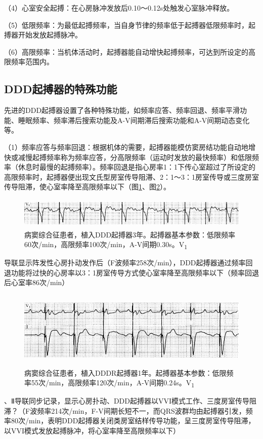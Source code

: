（4）心室安全起搏：在心房脉冲发放后0.10～0.12s处触发心室脉冲释放。

（5）低限频率：为最低起搏频率，当自身节律的频率低于起搏器低限频率时，起搏器开始发放起搏脉冲。

（6）高限频率：当机体活动时，起搏器能自动增快起搏频率，可达到所设定的高限频率范围内。

\protect\hypertarget{text00045.htmlux5cux23subid496}{}{}

\subsection{DDD起搏器的特殊功能}

先进的DDD起搏器设置了各种特殊功能，如频率应答、频率回退、频率平滑功能、睡眠频率、频率滞后搜索功能及A-V间期滞后搜索功能和A-V间期动态变化等。

（1）频率应答与频率回退：根据机体的需要，起搏器能模仿窦房结功能自动地增快或减慢起搏频率称为频率应答，分高限频率（运动时发放的最快频率）和低限频率（休息时最慢的起搏频率）。频率回退是指心房率1：1下传心室超过了所设定的高限频率时，起搏器便出现文氏型房室传导阻滞、2：1～3：1房室传导或三度房室传导阻滞，使心室率降至高限频率以下（图\ref{fig38-28}、图\ref{fig38-29}）。

\begin{figure}[!htbp]
 \centering
 \includegraphics[width=5.58333in,height=0.58333in]{./images/Image00631.jpg}
 \captionsetup{justification=centering}
 \caption{病窦综合征患者，植入DDD起搏器3年。起搏器基本参数：低限频率60次/min，高限频率100次/min，A-V间期0.30s。V\textsubscript{1}}
 \label{fig38-28}
  \end{figure} 
导联显示阵发性心房扑动发作后（F波频率258次/min），DDD起搏器通过频率回退功能将过快的心房率以3：1房室传导方式使心室率降至高限频率以下（频率回退后心室率86次/min）

\begin{figure}[!htbp]
 \centering
 \includegraphics[width=5.58333in,height=1.45833in]{./images/Image00632.jpg}
 \captionsetup{justification=centering}
 \caption{病窦综合征患者，植入DDDR起搏器1年。起搏器基本参数：低限频率55次/min，高限频率120次/min，A-V间期0.24s。V\textsubscript{1}}
 \label{fig38-29}
  \end{figure} 
、Ⅱ导联同步记录，显示心房扑动、DDD起搏器以VVI模式工作、三度房室传导阻滞？（F波频率214次/min，F-V间期长短不一，而QRS波群均由起搏器引发，频率80次/min，表明DDD起搏器关闭类房室结样传导功能，呈三度房室传导阻滞，以VVI模式发放起搏脉冲，将心室率降至高限频率以下）

